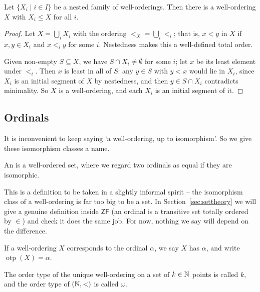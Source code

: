 \documentclass[a4paper]{scrartcl}
\newcommand{\otp}{\operatorname{otp}}
\newcommand{\ZF}{\mathsf{ZF}}
\begin{document}
\begin{proposition}\label{prop:nestedunion}
  Let $\{X_i \mid i \in I\}$ be a nested family of well-orderings. Then there is a well-ordering $X$ with $X_i \leq X$ for all $i$.
\end{proposition}
\begin{proof}
  Let $X = \bigcup_i X_i$ with the ordering $<_X = \bigcup_i <_i$; that is, $x < y$ in $X$ if $x, y \in X_i$ and $x <_i y$ for some $i$. Nestedness makes this a well-defined total order.

  Given non-empty $S \subseteq X$, we have $S \cap X_i \neq \emptyset$ for some $i$; let $x$ be its least element under $<_i$. Then $x$ is least in all of $S$: any $y \in S$ with $y < x$ would lie in $X_i$, since $X_i$ is an initial segment of $X$ by nestedness, and then $y \in S \cap X_i$ contradicts minimality. So $X$ is a well-ordering, and each $X_i$ is an initial segment of it.
\end{proof}

\subsection{Ordinals}

It is inconvenient to keep saying `a well-ordering, up to isomorphism'. So we give these isomorphism classes a name.

\begin{definition}[Ordinal]
  An  is a well-ordered set, where we regard two ordinals as equal if they are isomorphic.
\end{definition}

This is a definition to be taken in a slightly informal spirit -- the isomorphism class of a well-ordering is far too big to be a set. In Section~\ref{sec:settheory} we will give a genuine definition inside $\ZF$ (an ordinal is a transitive set totally ordered by $\in$) and check it does the same job. For now, nothing we say will depend on the difference.

\begin{definition}
  If a well-ordering $X$ corresponds to the ordinal $\alpha$, we say $X$ has  $\alpha$, and write $\otp(X) = \alpha$.
\end{definition}

The order type of the unique well-ordering on a set of $k \in \mathbb{N}$ points is called $k$, and the order type of $(\mathbb{N}, <)$ is called $\omega$.
\end{document}
